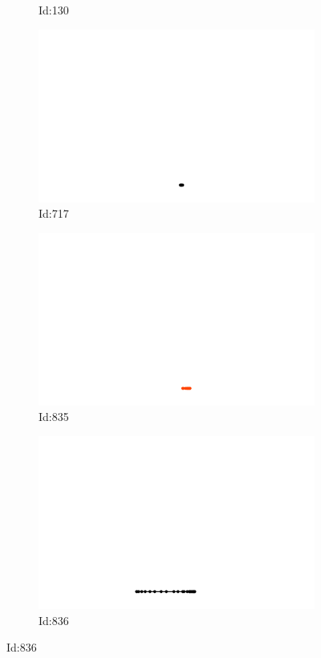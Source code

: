 \documentclass[12pt,twoside]{report}
\begin{document}
\begin{figure}
\begin{subfigure}[b]{0.20\textwidth}
\caption{Id:130}
\end{subfigure}
\begin{subfigure}[b]{0.20\textwidth}
\centering
\includegraphics[width=\textwidth]{../../trajectories/717.png}
\caption{Id:717}
\end{subfigure}
\begin{subfigure}[b]{0.20\textwidth}
\centering
\includegraphics[width=\textwidth]{../../trajectories/835.png}
\caption{Id:835}
\end{subfigure}
\begin{subfigure}[b]{0.20\textwidth}
\centering
\includegraphics[width=\textwidth]{../../trajectories/836.png}
\caption{Id:836}
\end{subfigure}
\end{figure}
\end{document}
